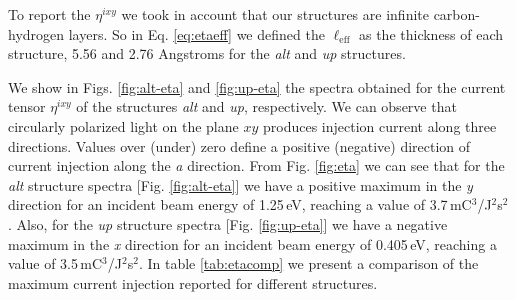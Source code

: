 \documentclass[twocolumn,aps,pra,11pt,tightenlines,showpacs,superscriptaddress,groupedaddress]{revtex4-1}
\newcommand{\ea}{$\eta^{ixy}$}
\begin{document}
To report the {\ea} we took in account that our structures are infinite carbon-hydrogen layers. So in Eq. \ref{eq:etaeff} we defined the $\ell_{\text{eff}}$ as the thickness of each structure, 5.56 and 2.76 Angstroms for the \emph{alt} and \emph{up} structures.

We show in Figs. \ref{fig:alt-eta} and \ref{fig:up-eta}  the spectra obtained for the current tensor {\ea} of the structures \emph{alt} and \emph{up}, respectively. We can observe that circularly polarized light on the plane $xy$ produces injection current along three directions. Values over (under) zero define a positive (negative) direction of current injection along the \emph{a} direction. From Fig. \ref{fig:eta} we can see that for the \emph{alt} structure spectra [Fig. \ref{fig:alt-eta}] we have a positive maximum in the \emph{y} direction for an incident beam energy of 1.25\,eV, reaching a value of 3.7\,mC$^{3}$/J$^{2}$s$^{2}$ . Also, for the \emph{up} structure spectra [Fig. \ref{fig:up-eta}] we have a negative maximum in the \emph{x} direction for an incident beam energy of 0.405\,eV, reaching a value of 3.5\,mC$^{3}$/J$^{2}$s$^{2}$. In table \ref{tab:etacomp} we present a comparison of the maximum current injection reported for different structures.
\end{document}
